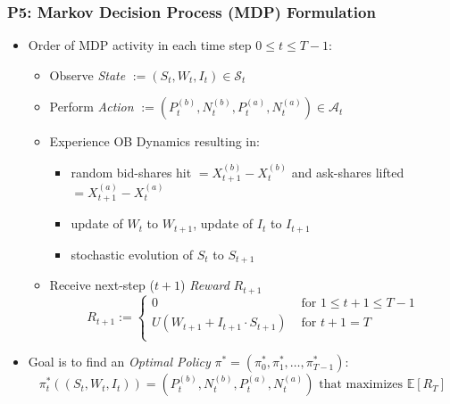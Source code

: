 \documentclass[handout]{beamer}
\begin{document}
\begin{frame}
\frametitle{P5: Markov Decision Process (MDP) Formulation}
\pause
\begin{itemize}[<+->]
\item Order of MDP activity in each time step $0 \leq t \leq T-1$:
\begin{itemize}
\item Observe {\em State} $:= (S_t, W_t, I_t) \in \mathcal{S}_t$
\item Perform {\em Action} $:= (P_t^{(b)}, N_t^{(b)}, P_t^{(a)}, N_t^{(a)}) \in \mathcal{A}_t$
\item Experience OB Dynamics resulting in:
\begin{itemize}
\item random bid-shares hit $=X_{t+1}^{(b)} - X_t^{(b)}$ and ask-shares lifted $=X_{t+1}^{(a)} - X_t^{(a)}$
\item update of $W_t$ to $W_{t+1}$, update of $I_t$ to $I_{t+1}$
\item stochastic evolution of $S_t$ to $S_{t+1}$
\end{itemize}
\item Receive next-step ($t+1$) {\em Reward} $R_{t+1}$
$$
R_{t+1} :=
\begin{cases}
0 & \text{ for }1 \leq t+1 \leq T-1 \\
U(W_{t+1} + I_{t+1} \cdot S_{t+1}) & \text{ for } t+1 = T \\
\end{cases}
$$
\end{itemize}
\item Goal is to find an {\em Optimal Policy} $\pi^* = (\pi_0^*, \pi_1^*, \ldots, \pi_{T-1}^*)$:
$$\pi_t^*((S_t, W_t, I_t)) = (P_t^{(b)}, N_t^{(b)}, P_t^{(a)}, N_t^{(a)}) \mbox{ that maximizes } \mathbb{E}[R_T]$$
\end{itemize}
\end{frame}
\end{document}

